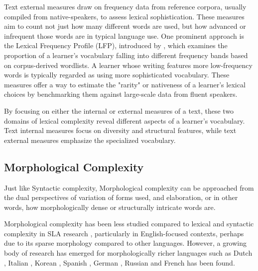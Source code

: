 Text external measures draw on frequency data from reference corpora, usually compiled from native-speakers, to
assess lexical sophistication.
These
measures aim
to count not just how many different words are used, but how advanced or infrequent those words are in
typical
language
use. One prominent approach is the Lexical Frequency Profile (LFP), introduced by \citet{Laufer1995}, which examines
the proportion of a learner's vocabulary falling into different frequency bands based on corpus-derived wordlists. A
learner whose writing features more low-frequency words is typically regarded as using more sophisticated vocabulary.
These measures offer a way to estimate the "rarity" or nativeness of a learner's lexical choices by benchmarking
them against large-scale data from fluent speakers.

By focusing on either the internal or external measures of a text, these two domains of lexical complexity
reveal different aspects of a learner's vocabulary. Text internal measures focus on diversity and structural
features, while text external measures emphasize the specialized vocabulary.

\subsection{Morphological Complexity}
Just like
Syntactic complexity, Morphological
complexity can be approached from the dual perspectives of variation of forms used, and
    elaboration, or in other words, how morphologically dense or structurally intricate words are.

Morphological complexity has been less studied
compared to lexical and syntactic complexity in SLA research \citep{Butle2012}, particularly in English-focused
contexts, perhaps due to its sparse morphology compared to other languages. However, a growing body of research has
emerged for
morphologically richer
languages such as Dutch \citep{vanderslik2019}, Italian
\citep{Brezina2019,dellorletta2011,Romano2017}, Korean \citep{Hwang2024},  Spanish \citep{Garcia2021, Malvern2004}, German
\citep{hancke2012-readability},
Russian \citep{reynolds2016-insights} and
French \citep{DeClercq2019,francois2012-ai}
has been
found.

